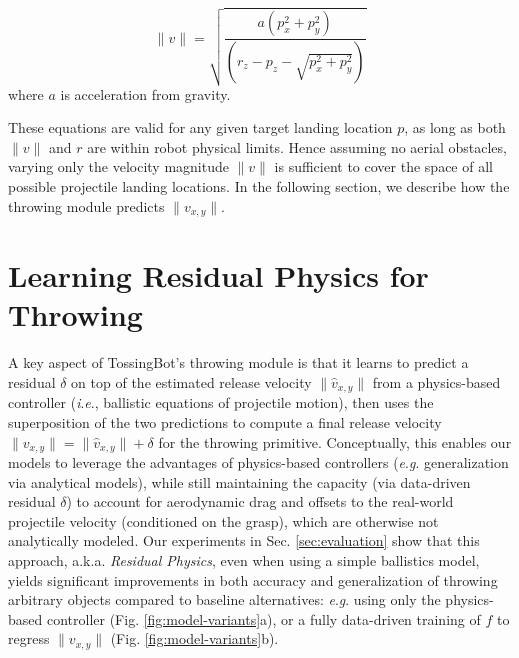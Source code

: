 \documentclass[journal]{IEEEtran}
\newcommand{\ie}{\textit{i}.\textit{e}., }
\newcommand{\eg}{\textit{e}.\textit{g}. }
\begin{document}
\begin{equation}
  \|v\| = \sqrt{\frac{a(p_x^2+p_y^2)}{(r_z-p_z-\sqrt{p_x^2+p_y^2})}}
\end{equation}
where $a$ is acceleration from gravity.

These equations are valid for any given target landing location $p$, as long as both $\|v\|$ and $r$ are within robot physical limits.  Hence assuming no aerial obstacles, varying only the velocity magnitude $\|v\|$ is sufficient to cover the space of all possible projectile landing locations.  %
In the following section, we describe how the throwing module predicts $\|v_{x,y}\|$.

\section{Learning Residual Physics for Throwing}
\label{sec:residual-physics}

A key aspect of TossingBot's throwing module is that it learns to predict a residual $\delta$ on top of the estimated release velocity $\|\hat{v}_{x,y}\|$ from a physics-based controller (\ie ballistic equations of projectile motion), then uses the superposition of the two predictions to compute a final release velocity $\|v_{x,y}\|=\|\hat{v}_{x,y}\|+\delta$ for the throwing primitive. Conceptually, this enables our models to leverage the advantages of physics-based controllers (\eg generalization via analytical models), while still maintaining the capacity (via data-driven residual $\delta$) to account for aerodynamic drag and offsets to the real-world projectile velocity (conditioned on the grasp), which are otherwise not analytically modeled. Our experiments in Sec. \ref{sec:evaluation} show that this approach, a.k.a. \textit{Residual Physics}, even when using a simple ballistics model, yields significant improvements in both accuracy and generalization of throwing arbitrary objects compared to baseline alternatives: \eg using only the physics-based controller (Fig. \ref{fig:model-variants}a), or a fully data-driven training of $f$ to regress $\|v_{x,y}\|$ (Fig. \ref{fig:model-variants}b).
\end{document}

